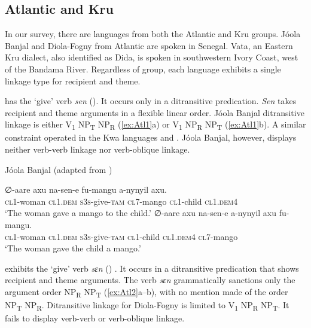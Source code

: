 \documentclass[output=paper,colorlinks,citecolor=brown]{langscibook}
\begin{document}
\subsection{Atlantic and Kru}

In our survey, there are languages from both the Atlantic and Kru groups. Jóola Banjal and Diola-Fogny from Atlantic are spoken in Senegal. Vata, an Eastern Kru dialect, also identified as Dida, is spoken in southwestern Ivory Coast, west of the Bandama River. Regardless of group, each language exhibits a single linkage type for recipient and theme.

 has the ‘give’ verb \textit{sen} (\cite{Bassène2007}). It occurs only in a ditransitive predication. \textit{Sen} takes recipient and theme arguments in a flexible linear order. Jóola Banjal ditransitive linkage is either V\textsubscript{1} NP\textsubscript{T} NP\textsubscript{R} (\ref{ex:Atl1}a) or V\textsubscript{1} NP\textsubscript{R} NP\textsubscript{T} (\ref{ex:Atl1}b). A similar constraint operated in the Kwa languages  and . Jóola Banjal, however, displays neither verb-verb linkage nor verb-oblique linkage.

\ea \label{ex:Atl1} Jóola Banjal (adapted from \citealt[130]{Bassène2007})
\begin{xlist}
\ex
\gll ∅-aare			axu			na-sen-e				fu-mangu			a-nynyil			axu.\\
		\textsc{cl}1-woman		\textsc{cl1.dem}		\textsc{s3s}-give-\textsc{tam}		\textsc{cl}7-mango		\textsc{cl}1-child		\textsc{cl1.dem4}\\
\glt					‘The woman gave a mango to the child.’
\ex
\gll 	∅-aare			axu			na-sen-e			a-nynyil			axu				fu-mangu.\\
	\textsc{cl}1-woman		\textsc{cl1.dem}		\textsc{s3s}-give-\textsc{tam}	\textsc{cl1}-child		\textsc{cl1.dem4}		\textsc{cl7}-mango\\
 \glt ‘The woman gave the child a mango.’
\end{xlist}
\z

 exhibits the ‘give’ verb \textit{sɛn} (\cite{Sapir1965}) . It occurs in a ditransitive predication that shows recipient and theme arguments. The verb \textit{sɛn} grammatically sanctions only the argument order NP\textsubscript{R} NP\textsubscript{T} (\ref{ex:Atl2}a--b), with no mention made of the order NP\textsubscript{T} NP\textsubscript{R}. Ditransitive linkage for Diola-Fogny is limited to V\textsubscript{1} NP\textsubscript{R} NP\textsubscript{T}. It fails to display verb-verb or verb-oblique linkage.
\end{document}
